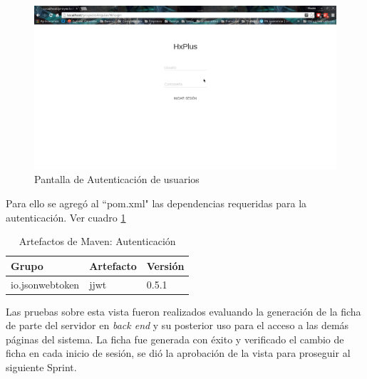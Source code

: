     \begin{figure}[htbp!]
        \begin{center}
            \includegraphics[width=.9\textwidth]{figures/p1}
        \end{center}
        \caption{Pantalla de Autenticación de usuarios}
        \label{Autenticación}
    \end{figure}
    
    Para ello se agregó al ``pom.xml" las dependencias requeridas para la autenticación. Ver cuadro \ref{artefactos-tba}
    
    \begin{table}[h!]
        
        \begin{center}
            \begin{tabular}{|l|l|l|}\hline
                Grupo & Artefacto & Versión \\\hline
                io.jsonwebtoken & jjwt & 0.5.1 \\\hline
            \end{tabular}
        \end{center}
        
        \caption{Artefactos de Maven: Autenticación}
        \label{artefactos-tba}
    \end{table}
    
    Las pruebas sobre esta vista fueron realizados evaluando la generación de la ficha de parte del servidor en \textit{back end} y su posterior uso para el acceso a las demás páginas del sistema. La ficha fue generada con éxito y verificado el cambio de ficha en cada inicio de sesión, se dió la aprobación de la vista para proseguir al siguiente Sprint.
    
%    
    
